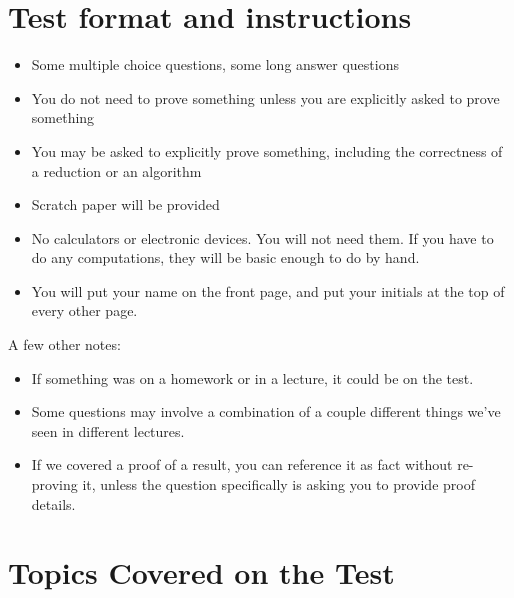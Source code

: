 \documentclass[11 pt]{exam}
\begin{document}

	\section{Test format and instructions}

	\begin{itemize}
		\item Some multiple choice questions, some long answer questions
		\item You do not need to prove something unless you are explicitly asked to prove something
		\item You may be asked to explicitly prove something, including the correctness of a reduction or an algorithm
		\item Scratch paper will be provided
		\item No calculators or electronic devices. You will not need them. If you have to do any computations, they will be basic enough to do by hand.
		\item You will put your name on the front page, and put your initials at the top of every other page.
	\end{itemize}

	A few other notes:
	\begin{itemize}
		\item If something was on a homework or in a lecture, it could be on the test.
		\item Some questions may involve a combination of a couple different things we've seen in different lectures.
		\item If we covered a proof of a result, you can reference it as fact without re-proving it, unless the question specifically is asking you to provide proof details.
	\end{itemize}

	\newpage

	\section{Topics Covered on the Test}
\end{document}
